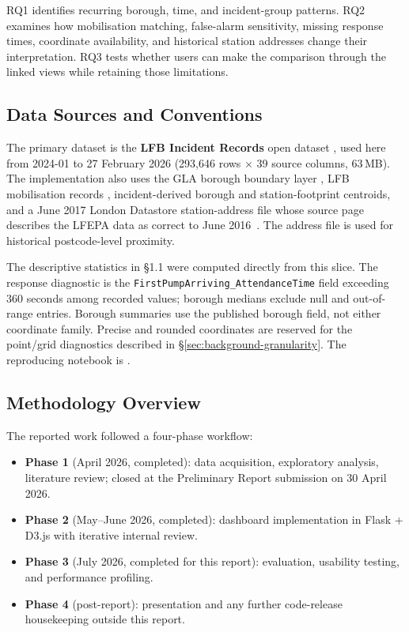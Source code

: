 RQ1 identifies recurring borough, time, and incident-group patterns. RQ2 examines how mobilisation matching, false-alarm sensitivity, missing response times, coordinate availability, and historical station addresses change their interpretation. RQ3 tests whether users can make the comparison through the linked views while retaining those limitations.

\subsection{Data Sources and Conventions}

The primary dataset is the \textbf{LFB Incident Records} open dataset \cite{lfb_incidents}, used here from 2024-01 to 27 February 2026 (293{,}646 rows $\times$ 39 source columns, 63\,MB). The implementation also uses the GLA borough boundary layer \cite{ons_boundaries}, LFB mobilisation records \cite{lfb_mobilisations}, incident-derived borough and station-footprint centroids, and a June 2017 London Datastore station-address file whose source page describes the LFEPA data as correct to June 2016~\cite{lfb_stations}. The address file is used for historical postcode-level proximity.

The descriptive statistics in \S1.1 were computed directly from this slice. The response diagnostic is the \texttt{FirstPumpArriving\_AttendanceTime} field exceeding 360 seconds among recorded values; borough medians exclude null and out-of-range entries. Borough summaries use the published borough field, not either coordinate family. Precise and rounded coordinates are reserved for the point/grid diagnostics described in \S\ref{sec:background-granularity}. The reproducing notebook is .

\subsection{Methodology Overview}

The reported work followed a four-phase workflow:

\begin{itemize}
    \item \textbf{Phase 1} (April 2026, completed): data acquisition, exploratory analysis, literature review; closed at the Preliminary Report submission on 30 April 2026.
    \item \textbf{Phase 2} (May--June 2026, completed): dashboard implementation in Flask + D3.js with iterative internal review.
    \item \textbf{Phase 3} (July 2026, completed for this report): evaluation, usability testing, and performance profiling.
    \item \textbf{Phase 4} (post-report): presentation and any further code-release housekeeping outside this report.
\end{itemize}


